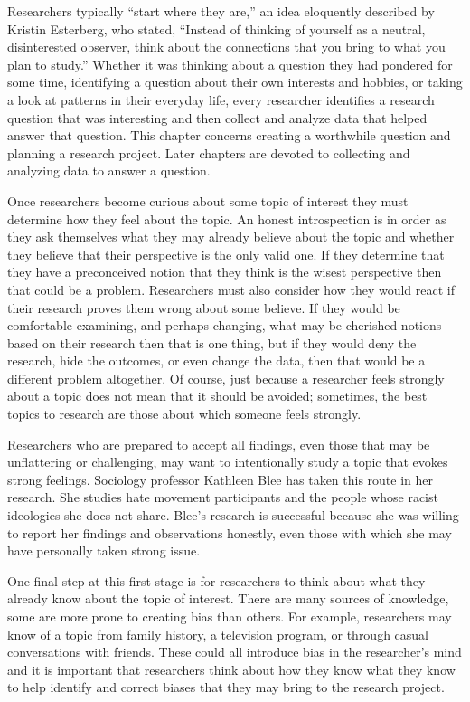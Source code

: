 Researchers typically ``start where they are,'' an idea eloquently described by Kristin Esterberg\cite{esterberg2002qualitative}, who stated, ``Instead of thinking of yourself as a neutral, disinterested observer, think about the connections that you bring to what you plan to study.'' Whether it was thinking about a question they had pondered for some time, identifying a question about their own interests and hobbies, or taking a look at patterns in their everyday life, every researcher identifies a research question that was interesting and then collect and analyze data that helped answer that question. This chapter concerns creating a worthwhile question and planning a research project. Later chapters are devoted to collecting and analyzing data to answer a question.

Once researchers become curious about some topic of interest they must determine how they feel about the topic. An honest introspection is in order as they ask themselves what they may already believe about the topic and whether they believe that their perspective is the only valid one. If they determine that they have a preconceived notion that they think is the wisest perspective then that could be a problem. Researchers must also consider how they would react if their research proves them wrong about some believe. If they would be comfortable examining, and perhaps changing, what may be cherished notions based on their research then that is one thing, but if they would deny the research, hide the outcomes, or even change the data, then that would be a different problem altogether. Of course, just because a researcher feels strongly about a topic does not mean that it should be avoided; sometimes, the best topics to research are those about which someone feels strongly. 

Researchers who are prepared to accept all findings, even those that may be unflattering or challenging, may want to intentionally study a topic that evokes strong feelings. Sociology professor Kathleen Blee\cite{blee2005racial} has taken this route in her research. She studies hate movement participants and the people whose racist ideologies she does not share. Blee's research is successful because she was willing to report her findings and observations honestly, even those with which she may have personally taken strong issue.

One final step at this first stage is for researchers to think about what they already know about the topic of interest. There are many sources of knowledge, some are more prone to creating bias than others. For example, researchers may know of a topic from family history, a television program, or through casual conversations with friends. These could all introduce bias in the researcher's mind and it is important that researchers think about how they know what they know to help identify and correct biases that they may bring to the research project.

